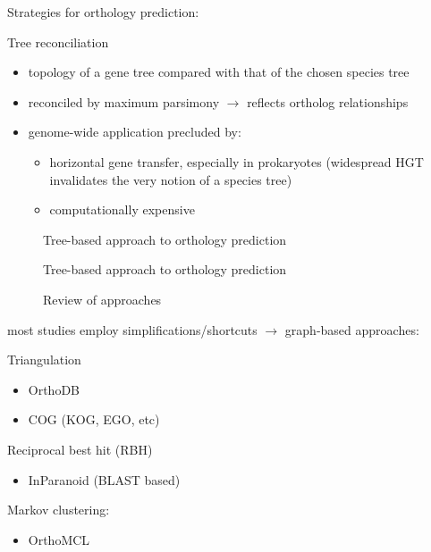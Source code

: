 Strategies for orthology prediction:

Tree reconciliation

\begin{itemize}
	\item topology of a gene tree compared with that of the chosen species tree
	\item reconciled by maximum parsimony $\rightarrow$ reflects ortholog
		relationships
	\item genome-wide application precluded by:
	\begin{itemize}
		\item horizontal gene transfer, especially in prokaryotes (widespread HGT
			invalidates the very notion of a species tree)
		\item computationally expensive
	\end{itemize}
\end{itemize}

\begin{description}
	\item[\cite{mirkin1995}] Tree-based approach to orthology prediction
	\item[\cite{yuan1998}] Tree-based approach to orthology prediction
	\item[\cite{kuzniar2008}] Review of approaches
\end{description}

most studies employ simplifications/shortcuts $\rightarrow$ graph-based approaches:

Triangulation

\begin{itemize}
	\item OrthoDB 
	\item COG (KOG, EGO, etc)
\end{itemize}

Reciprocal best hit (RBH) 

\begin{itemize}
	\item InParanoid (BLAST based)
\end{itemize}

Markov clustering:

\begin{itemize}
	\item OrthoMCL
\end{itemize}

